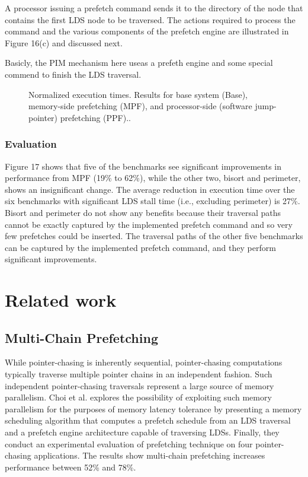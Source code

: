 \documentclass{acm_proc_article-sp}
\begin{document}
A processor issuing a prefetch command sends it to the directory of
the node that contains the first LDS node to be traversed. The actions
required to process the command and the various components of the prefetch 
engine are illustrated in Figure 16(c) and discussed next.

Basicly, the PIM mechanism here useas a prefeth engine and some
special commend to finish the LDS traversal.

\begin{figure*}
\centering
{}
\caption{Normalized execution times. Results for base system (Base), memory-side
prefetching (MPF), and processor-side (software jump-pointer)
prefetching (PPF)..\cite{Hughes:2005:MPL:1066486.1066491}} 
\end{figure*}

\subsubsection{Evaluation}

Figure 17 shows that five of the benchmarks see significant
improvements in performance from MPF (19\% 
to 62\%), while the other two, bisort and perimeter, shows an
insignificant change. The average reduction in 
execution time over the six benchmarks with significant LDS stall time
(i.e., excluding perimeter) is 27\%. 
Bisort and perimeter do not show any benefits because their traversal
paths cannot be exactly captured by the implemented prefetch command
and so very few prefetches could be inserted. The traversal paths of
the other five benchmarks can be captured by the implemented prefetch 
command, and they perform significant improvements. 

\section{Related work}


\subsection{Multi-Chain Prefetching\cite{Choi:2004:GFP:986533.986536}}

While pointer-chasing is inherently sequential, pointer-chasing
computations typically traverse multiple pointer chains in an
independent fashion. Such independent pointer-chasing traversals
represent a large source of memory parallelism. Choi et al. explores
the possibility of exploiting such memory  parallelism for the
purposes of memory latency tolerance by presenting a memory
scheduling algorithm that computes a prefetch schedule from an LDS
traversal  and  a prefetch engine architecture capable of traversing
LDSs.  Finally, they conduct an experimental evaluation of
prefetching technique on 
four pointer-chasing applications. The results show multi-chain
prefetching increases performance between 52\% and 78\%. 
\end{document}
